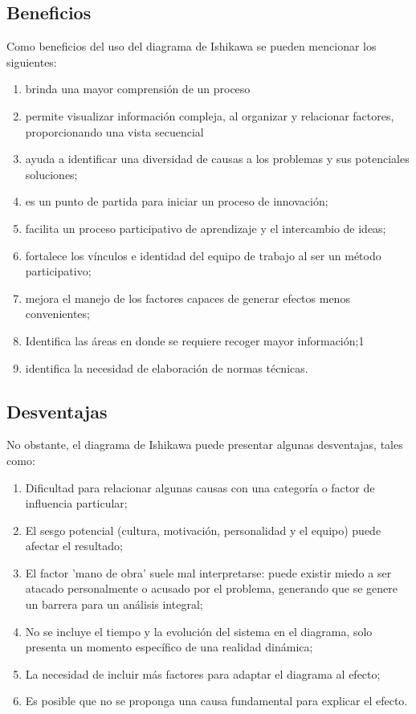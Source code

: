 \documentclass[../main]{subfiles}
\begin{document}
\subsection{Beneficios}
Como beneficios del uso del diagrama de Ishikawa se pueden mencionar
los siguientes:
\begin{enumerate}
  \item brinda una mayor comprensión de un proceso
  \item permite visualizar información compleja, al organizar y
    relacionar factores, proporcionando una vista secuencial
  \item ayuda a identificar una diversidad de causas a los problemas
    y sus potenciales soluciones;
  \item es un punto de partida para iniciar un proceso de innovación;
  \item facilita un proceso participativo de aprendizaje y el
    intercambio de ideas;
  \item fortalece los vínculos e identidad del equipo de trabajo al
    ser un método participativo;
  \item mejora el manejo de los factores capaces de generar efectos
    menos convenientes;
  \item Identifica las áreas en donde se requiere recoger mayor información;1
  \item identifica la necesidad de elaboración de normas técnicas.
\end{enumerate}

\subsection{Desventajas}

No obstante, el diagrama de Ishikawa puede presentar algunas
desventajas, tales como:

\begin{enumerate}
  \item Dificultad para relacionar algunas causas con una categoría o
    factor de influencia particular;
  \item El sesgo potencial (cultura, motivación, personalidad y el
    equipo) puede afectar el resultado;
  \item El factor 'mano de obra' suele mal interpretarse: puede
    existir miedo a ser atacado personalmente o  acusado por el
    problema, generando que se genere un barrera para un análisis integral;
  \item No se incluye el tiempo y la evolución del sistema en el
    diagrama, solo presenta un momento específico de una realidad dinámica;
  \item La necesidad de incluir más factores para adaptar el diagrama al efecto;
  \item Es posible que no se proponga una causa fundamental para
    explicar el efecto.
\end{enumerate}
\end{document}

